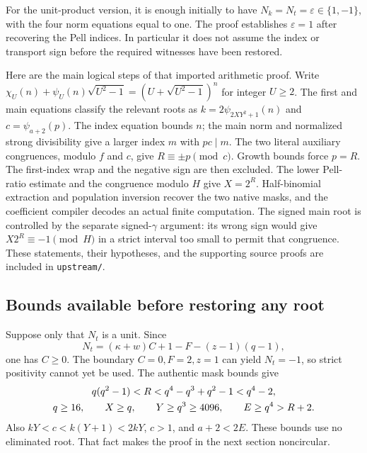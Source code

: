 \documentclass[11pt]{article}
\newcommand{\src}[1]{\nolinkurl{#1}}
\theoremstyle{remark}\newtheorem{remark}[theorem]{Remark}
\begin{document}
For the unit-product version, it is enough initially to have
$N_k=N_t=\varepsilon\in\{1,-1\}$, with the four norm equations equal to one.
The proof establishes $\varepsilon=1$ after recovering the Pell indices.
In particular it does not assume the index or transport sign before the
required witnesses have been restored.

Here are the main logical steps of that imported arithmetic proof. Write
$\chi_U(n)+\psi_U(n)\sqrt{U^2-1}=(U+\sqrt{U^2-1})^n$ for integer $U\ge2$.
The first and main equations classify the relevant roots as
$k=2\psi_{2XY^2+1}(n)$ and $c=\psi_{a+2}(p)$. The index equation bounds $n$;
the main norm and normalized strong divisibility give a larger index $m$
with $pc\mid m$. The two literal auxiliary congruences, modulo $f$ and $c$,
give $R\equiv\pm p\pmod c$. Growth bounds force $p=R$.
The first-index wrap and the negative sign are then excluded.
The lower Pell-ratio estimate and the congruence modulo $H$ give $X=2^R$.
Half-binomial extraction and population inversion recover the two native
masks, and the coefficient compiler decodes an actual finite computation.
The signed main root is controlled by the separate signed-$\gamma$ argument:
its wrong sign would give $X2^R\equiv-1\pmod H$ in a strict interval too small
to permit that congruence. These statements, their hypotheses, and the
supporting source proofs are included in \src{upstream/}.

\subsection{Bounds available before restoring any root}

Suppose only that $N_t$ is a unit. Since
\[
 N_t=(\kappa+w)C+1-F-(z-1)(q-1),
\]
one has $C\ge0$. The boundary $C=0,F=2,z=1$ can yield $N_t=-1$,
so strict positivity cannot yet be used. The authentic mask bounds give
\begin{gather}
 q(q^2-1)<R<q^4-q^3+q^2-1<q^4-2,\notag\\
 q\ge16,\qquad X\ge q,\qquad Y\ge q^3\ge4096,
 \qquad E\ge q^4>R+2.\label{eq:weak}
\end{gather}
Also $kY<c<k(Y+1)<2kY$, $c>1$, and $a+2<2E$.
These bounds use no eliminated root. That fact makes the proof in the next
section noncircular.





\end{document}

